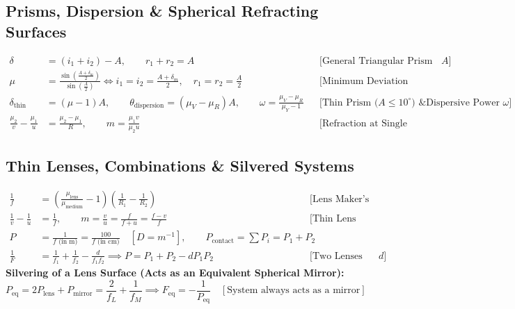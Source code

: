 \documentclass[11pt,a4paper]{article}
\begin{document}
\subsection{Prisms, Dispersion \& Spherical Refracting Surfaces}

\begin{formulabox}
\begin{align}
  \delta &= (i_1 + i_2) - A, \qquad r_1 + r_2 = A && \text{[General Triangular Prism of Angle } A\text{]} \\
  \mu &= \frac{\sin\left(\frac{A + \delta_m}{2}\right)}{\sin\left(\frac{A}{2}\right)} \iff i_1 = i_2 = \frac{A + \delta_m}{2}, \quad r_1 = r_2 = \frac{A}{2} && \text{[Minimum Deviation Condition; ray parallel to base]} \\
  \delta_{\text{thin}} &= (\mu - 1)A, \qquad \theta_{\text{dispersion}} = (\mu_V - \mu_R)A, \qquad \omega = \frac{\mu_V - \mu_R}{\mu_Y - 1} && \text{[Thin Prism ($A \le 10^\circ$) \& Dispersive Power $\omega$]} \\
  \frac{\mu_2}{v} - \frac{\mu_1}{u} &= \frac{\mu_2 - \mu_1}{R}, \qquad m = \frac{\mu_1 v}{\mu_2 u} && \text{[Refraction at Single Spherical Interface]}
\end{align}
\end{formulabox}

\subsection{Thin Lenses, Combinations \& Silvered Systems}

\begin{formulabox}
\begin{align}
  \frac{1}{f} &= \left(\frac{\mu_{\text{lens}}}{\mu_{\text{medium}}} - 1\right)\left(\frac{1}{R_1} - \frac{1}{R_2}\right) && \text{[Lens Maker's Formula]} \\
  \frac{1}{v} - \frac{1}{u} &= \frac{1}{f}, \qquad m = \frac{v}{u} = \frac{f}{f + u} = \frac{f - v}{f} && \text{[Thin Lens Equation \& Magnification]} \\
  P &= \frac{1}{f\text{ (in m)}} = \frac{100}{f\text{ (in cm)}} \quad [\si{D = m^{-1}}], \qquad P_{\text{contact}} = \sum P_i = P_1 + P_2 \\
  \frac{1}{F} &= \frac{1}{f_1} + \frac{1}{f_2} - \frac{d}{f_1 f_2} \implies P = P_1 + P_2 - d P_1 P_2 && \text{[Two Lenses Separated by Distance } d\text{]}
\end{align}
\textbf{Silvering of a Lens Surface (Acts as an Equivalent Spherical Mirror):}
\begin{equation}
  P_{\text{eq}} = 2P_{\text{lens}} + P_{\text{mirror}} = \frac{2}{f_L} + \frac{1}{f_M} \implies F_{\text{eq}} = -\frac{1}{P_{\text{eq}}} \quad [\text{System always acts as a mirror}]
\end{equation}
\end{formulabox}
\end{document}
